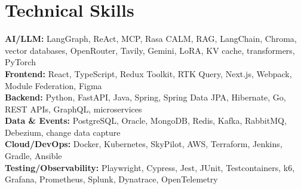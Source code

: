 \documentclass[letterpaper,11pt]{article}
\begin{document}
\section{Technical Skills}
\vspace{-2pt}
\begin{itemize}
[leftmargin=0.15in, label={}]\small{\item{
\textbf{AI/LLM:}{ LangGraph, ReAct, MCP, Rasa CALM, RAG, LangChain, Chroma, vector databases, OpenRouter, Tavily, Gemini, LoRA, KV cache, transformers, PyTorch} \\
\textbf{Frontend:}{ React, TypeScript, Redux Toolkit, RTK Query, Next.js, Webpack, Module Federation, Figma} \\
\textbf{Backend:}{ Python, FastAPI, Java, Spring, Spring Data JPA, Hibernate, Go, REST APIs, GraphQL, microservices} \\
\textbf{Data \& Events:}{ PostgreSQL, Oracle, MongoDB, Redis, Kafka, RabbitMQ, Debezium, change data capture} \\
\textbf{Cloud/DevOps:}{ Docker, Kubernetes, SkyPilot, AWS, Terraform, Jenkins, Gradle, Ansible} \\
\textbf{Testing/Observability:}{ Playwright, Cypress, Jest, JUnit, Testcontainers, k6, Grafana, Prometheus, Splunk, Dynatrace, OpenTelemetry}
}}
\end{itemize}
\end{document}
